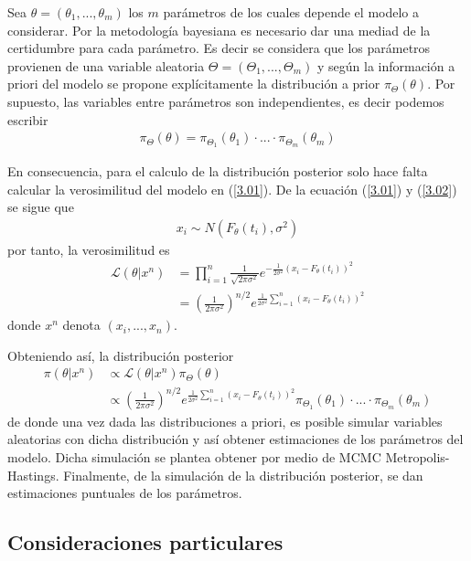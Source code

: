 \documentclass{article}
\begin{document}
Sea $\theta = (\theta_1, ...,\theta_m)$ los $m$ parámetros de los cuales depende el modelo a considerar. Por la metodología bayesiana es necesario dar una mediad de la certidumbre para cada parámetro. Es decir se considera que los parámetros provienen de una variable aleatoria $\Theta = (\Theta_1, ..., \Theta_m)$ y según la información a priori del modelo se propone explícitamente la distribución a prior $\pi_{\Theta}(\theta)$. Por supuesto, las variables entre parámetros son independientes, es decir podemos escribir
\begin{align*}
    \pi_{\Theta}(\theta) = \pi_{\Theta_1}(\theta_1) \cdot ... \cdot \pi_{\Theta_m}(\theta_m)
\end{align*}

En consecuencia, para el calculo de la distribución posterior solo hace falta calcular la verosimilitud del modelo en (\ref{3.01}). De la ecuación (\ref{3.01}) y (\ref{3.02}) se sigue que
\begin{align*}
    x_i \sim N(F_\theta(t_i), \sigma^2)
\end{align*}
por tanto, la verosimilitud es
\begin{align*}
    \mathcal{L}(\theta|x^n) &= \prod_{i=1}^n \frac{1}{\sqrt{2\pi \sigma^2}} e^{-\frac{1}{2\sigma^2}\left(x_i - F_{\theta}(t_i)\right)^2 } \\
    &= \left(\frac{1}{2\pi\sigma^2}\right)^{n/2} e^{\frac{1}{2\sigma^2} \sum_{i =1}^{n}\left(x_i - F_{\theta}(t_i)\right) ^2} 
\end{align*}
donde $x^n$ denota $(x_i,..., x_n)$.


Obteniendo así, la distribución posterior 
\begin{align*}
    \pi(\theta|x^n) &\propto \mathcal{L}(\theta|x^n) \pi_{\Theta}(\theta)\\
    & \propto \left(\frac{1}{2\pi\sigma^2}\right)^{n/2} e^{\frac{1}{2\sigma^2} \sum_{i =1}^{n}\left(x_i - F_{\theta}(t_i)\right) ^2} \pi_{\Theta_1}(\theta_1) \cdot ... \cdot \pi_{\Theta_m}(\theta_m)
\end{align*}
de donde una vez dada las distribuciones a priori, es posible simular variables aleatorias con dicha distribución y así obtener estimaciones de los parámetros del modelo. Dicha simulación se plantea obtener por medio de MCMC Metropolis-Hastings. Finalmente, de la simulación de la distribución posterior, se dan estimaciones puntuales de los parámetros.

\subsection{Consideraciones particulares}
\end{document}
